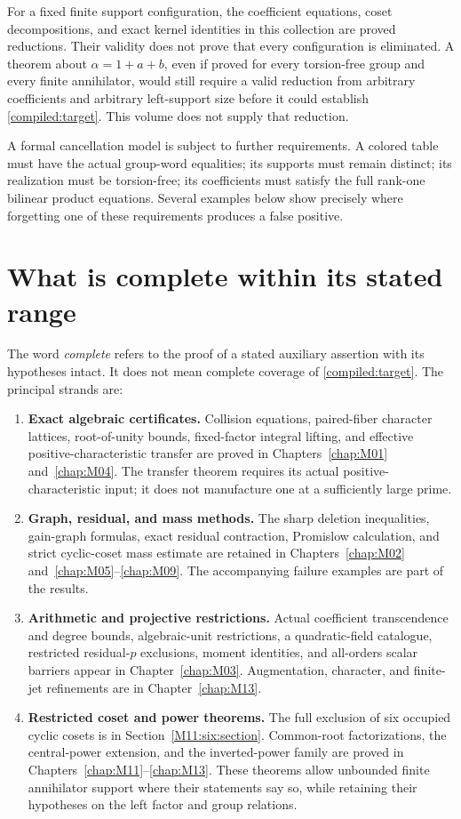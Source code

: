 \documentclass[11pt,a4paper,oneside]{report}
\theoremstyle{definition}
\theoremstyle{remark}
\begin{document}
For a fixed finite support configuration, the coefficient equations,
coset decompositions, and exact kernel identities in this collection
are proved reductions. Their validity does not prove that every
configuration is eliminated. A theorem about $\alpha=1+a+b$, even if
proved for every torsion-free group and every finite annihilator,
would still require a valid reduction from arbitrary coefficients
and arbitrary left-support size before it could establish
\eqref{compiled:target}. This volume does not supply that reduction.

A formal cancellation model is subject to further requirements.
A colored table must have the actual group-word equalities; its
supports must remain distinct; its realization must be torsion-free;
its coefficients must satisfy the full rank-one bilinear product
equations. Several examples below show precisely where forgetting
one of these requirements produces a false positive.

\section{What is complete within its stated range}
The word \emph{complete} refers to the proof of a stated auxiliary
assertion with its hypotheses intact. It does not mean complete
coverage of \eqref{compiled:target}. The principal strands are:
\begin{enumerate}
\item \textbf{Exact algebraic certificates.}
Collision equations, paired-fiber character lattices, root-of-unity
bounds, fixed-factor integral lifting, and effective
positive-characteristic transfer are proved in
Chapters~\ref{chap:M01} and~\ref{chap:M04}. The transfer theorem
requires its actual positive-characteristic input; it does not
manufacture one at a sufficiently large prime.
\item \textbf{Graph, residual, and mass methods.}
The sharp deletion inequalities, gain-graph formulas, exact residual
contraction, Promislow calculation, and strict cyclic-coset mass
estimate are retained in Chapters~\ref{chap:M02}
and~\ref{chap:M05}--\ref{chap:M09}.
The accompanying failure examples are part of the results.
\item \textbf{Arithmetic and projective restrictions.}
Actual coefficient transcendence and degree bounds, algebraic-unit
restrictions, a quadratic-field catalogue, restricted residual-$p$
exclusions, moment identities, and all-orders scalar barriers
appear in Chapter~\ref{chap:M03}. Augmentation, character,
and finite-jet refinements are in Chapter~\ref{chap:M13}.
\item \textbf{Restricted coset and power theorems.}
The full exclusion of six occupied cyclic cosets is in
Section~\ref{M11:six:section}. Common-root factorizations, the
central-power extension, and the inverted-power family are
proved in Chapters~\ref{chap:M11}--\ref{chap:M13}.
These theorems allow unbounded finite annihilator support where
their statements say so, while retaining their hypotheses
on the left factor and group relations.
\end{enumerate}
\end{document}
